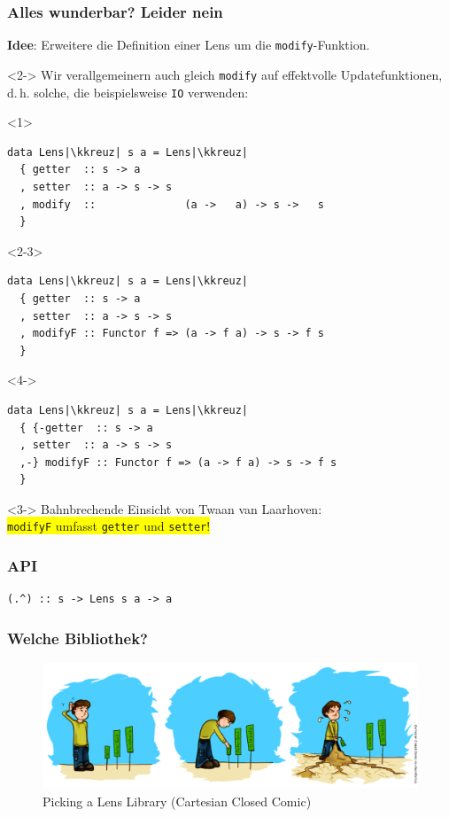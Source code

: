 \documentclass{beamer}
\newcommand{\kkreuz}{$\,^\ddag$} %
\begin{document}
\begin{frame}[fragile]
  \frametitle{Alles wunderbar? Leider nein}
  \textbf{Idee}: Erweitere die Definition einer Lens um die \texttt{modify}-Funktion. \\
  \begin{visibleenv}<2->
    Wir verallgemeinern auch gleich \texttt{modify} auf effektvolle Updatefunktionen, d.\,h. solche, die beispielsweise \texttt{IO} verwenden:
  \end{visibleenv}
  \begin{onlyenv}<1>
\begin{verbatim}
data Lens|\kkreuz| s a = Lens|\kkreuz|
  { getter  :: s -> a
  , setter  :: a -> s -> s
  , modify  ::              (a ->   a) -> s ->   s
  }
\end{verbatim}
  \end{onlyenv}
  \begin{onlyenv}<2-3>
\begin{verbatim}
data Lens|\kkreuz| s a = Lens|\kkreuz|
  { getter  :: s -> a
  , setter  :: a -> s -> s
  , modifyF :: Functor f => (a -> f a) -> s -> f s
  }
\end{verbatim}
  \end{onlyenv}
  \begin{onlyenv}<4->
\begin{verbatim}
data Lens|\kkreuz| s a = Lens|\kkreuz|
  { {-getter  :: s -> a
  , setter  :: a -> s -> s
  ,-} modifyF :: Functor f => (a -> f a) -> s -> f s
  }
\end{verbatim}
  \end{onlyenv}

  \vspace{2em}

  \begin{onlyenv}<3->
    \Large Bahnbrechende Einsicht von Twaan van Laarhoven: \\

    \colorbox{yellow}{
      \huge \texttt{modifyF} umfasst \texttt{getter} und \texttt{setter}!
    }
  \end{onlyenv}
\end{frame}

\begin{frame}[fragile]
  \frametitle{API}
\begin{verbatim}
(.^) :: s -> Lens s a -> a
\end{verbatim}
\end{frame}

\begin{frame}
  \frametitle{Welche Bibliothek?}
  \begin{figure}
    \includegraphics[width=0.9\linewidth]{ccc-picking-lens-library.png}
    \caption{Picking a Lens Library (Cartesian Closed Comic)}
  \end{figure}
\end{frame}
\end{document}
